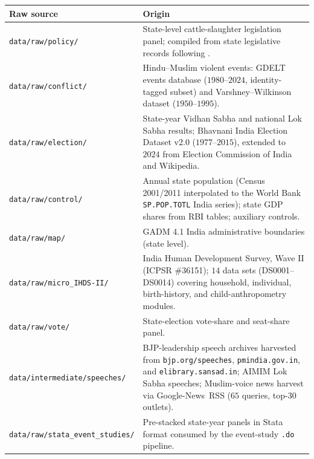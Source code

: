 \begin{table}[H]
\footnotesize
\centering
\begin{tabular}{@{}p{} p{}@{}}
\toprule
\textbf{Raw source} & \textbf{Origin} \\
\midrule
\texttt{data/raw/policy/}       & State-level cattle-slaughter legislation panel; compiled from
                                  state legislative records following \citet*{dasguptaNutritionalCostBeef2023}. \\
\texttt{data/raw/conflict/}     & Hindu--Muslim violent events: GDELT events database
                                  ($1980$--$2024$, identity-tagged subset) and
                                  Varshney--Wilkinson dataset
                                  ($1950$--$1995$). \\
\texttt{data/raw/election/}     & State-year Vidhan Sabha and national Lok Sabha results;
                                  Bhavnani India Election Dataset v2.0 ($1977$--$2015$),
                                  extended to $2024$ from Election Commission of India and Wikipedia. \\
\texttt{data/raw/control/}      & Annual state population (Census 2001/2011 interpolated to
                                  the World Bank \texttt{SP.POP.TOTL} India series); state GDP shares
                                  from RBI tables; auxiliary controls. \\
\texttt{data/raw/map/}          & GADM 4.1 India administrative boundaries (state level). \\
\texttt{data/raw/micro\_IHDS-II/} & India Human Development Survey, Wave II (ICPSR \#36151);
                                  $14$ data sets (DS0001--DS0014) covering household, individual,
                                  birth-history, and child-anthropometry modules. \\
\texttt{data/raw/vote/}         & State-election vote-share and seat-share panel. \\
\texttt{data/intermediate/speeches/} & BJP-leadership speech archives harvested from
                                  \texttt{bjp.org/speeches}, \texttt{pmindia.gov.in},
                                  and \texttt{elibrary.sansad.in}; AIMIM Lok Sabha
                                  speeches; Muslim-voice news harvest via Google-News~RSS
                                  ($65$ queries, top-$30$ outlets). \\
\texttt{data/raw/stata\_event\_studies/} & Pre-stacked state-year panels in Stata
                                  format consumed by the event-study \texttt{.do}
                                  pipeline. \\
\bottomrule
\end{tabular}
\end{table}


